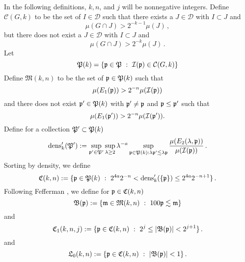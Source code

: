 In the following definitions, $k, n$, and
$j$ will be nonnegative integers.
Define
$\mathcal{C}(G,k)$ to be the set of $I\in \mathcal{D}$
such that there exists a $J\in \mathcal{D}$ with $I\subset J$
and
\begin{equation}\label{muhj1}
   {\mu(G \cap J)} > 2^{-k-1}{\mu(J)}\, ,
\end{equation}
but there does not exist a $J\in \mathcal{D}$ with $I\subset J$ and
\begin{equation}\label{muhj2}
   {\mu(G \cap J)} > 2^{-k}{\mu(J)}\,.
\end{equation}
Let
\begin{equation}
    \label{eq-defPk}
    {\mathfrak P}(k)=\{{\mathfrak p}\in {\mathfrak P} \ : \ {\mathcal{I}}({\mathfrak p})\in \mathcal{C}(G,k)\}
\end{equation}
Define $ {\mathfrak{M}}(k,n)$ to be the set of ${\mathfrak p} \in {\mathfrak P}(k)$ such that
 \begin{equation}\label{ebardense}
    \mu({E_1}({\mathfrak p})) > 2^{-n} \mu({\mathcal{I}}({\mathfrak p}))
 \end{equation}
and there does not exist ${\mathfrak p}'\in {\mathfrak P}(k)$ with
${\mathfrak p}'\neq {\mathfrak p}$ and ${\mathfrak p}\le {\mathfrak p}'$ such that
 \begin{equation}\label{mnkmax}
    \mu({E_1}({\mathfrak p}')) > 2^{-n} \mu({\mathcal{I}}({\mathfrak p}')).
 \end{equation}
Define for a collection ${\mathfrak P}'\subset {\mathfrak P}(k)$
\begin{equation}
    \label{eq-densdef}
   \operatorname{\operatorname{dens}}_k' ({\mathfrak P}'):= \sup_{{\mathfrak p}'\in {\mathfrak P}'}\sup_{\lambda \geq 2} \lambda^{-a} \sup_{{\mathfrak p} \in {\mathfrak P}(k): \lambda {\mathfrak p}' \lesssim \lambda {\mathfrak p}}
    \frac{\mu({E}_2(\lambda, {\mathfrak p}))}{\mu({\mathcal{I}}({\mathfrak p}))}\,.
\end{equation}
Sorting by density, we define
\begin{equation}
    \label{def-cnk}
    {\mathfrak C}(k,n):=\{{\mathfrak p}\in {\mathfrak P}(k) \ : \
    2^{4a}2^{-n}< \operatorname{\operatorname{dens}}_k'(\{{\mathfrak p}\}) \le
    2^{4a}2^{-n+1}\}\,.
\end{equation}
Following Fefferman \cite{fefferman}, we
define for ${\mathfrak p} \in {\mathfrak C}(k,n)$
\begin{equation}\label{defbfp}
     \mathfrak{B}(\fp) := \{ \mathfrak{m} \in \mathfrak{M}(k,n) \ : \ 100 \fp \lesssim \mathfrak{m}\}
\end{equation}
and
\begin{equation}\label{defcnkj}
       {\mathfrak C}_1(k,n,j) := \{{\mathfrak p} \in {\mathfrak C}(k,n) \ : \ 2^{j} \leq |\mathfrak{B}({\mathfrak p})| < 2^{j+1}\}\,.
\end{equation}
and
\begin{equation}\label{defl0nk}
       {\mathfrak L}_0(k,n) := \{{\mathfrak p} \in {\mathfrak C}(k,n) \ : \ |\mathfrak{B}({\mathfrak p})| <1\}\,.
\end{equation}
